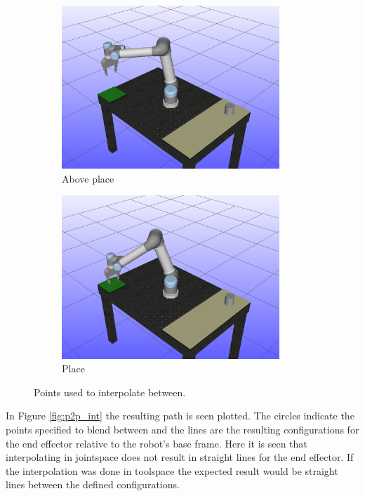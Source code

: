 \documentclass[../main.tex]{subfiles}
\begin{document}
\begin{figure}[H]
\begin{subfigure}[t]{0.3\textwidth}
        \includegraphics[width=0.9\textwidth]{figures/p2p_interpolation/above_place.png}
        \caption{Above place}
        \label{}
    \end{subfigure}
    \begin{subfigure}[t]{0.3\textwidth}
        \centering
        \captionsetup{width=.9\textwidth}
        \includegraphics[width=0.9\textwidth]{figures/p2p_interpolation/on_place.png}
        \caption{Place}
        \label{}
    \end{subfigure}
    \caption{Points used to interpolate between.}
    \label{fig:interpolation_points}
\end{figure}
In Figure \ref{fig:p2p_int} the resulting path is seen plotted. The circles indicate the points specified to blend between and the lines are the resulting configurations for the end effector relative to the robot's base frame. Here it is seen that interpolating in jointspace does not result in straight lines for the end effector. If the interpolation was done in toolspace the expected result would be straight lines between the defined configurations.
\end{document}
